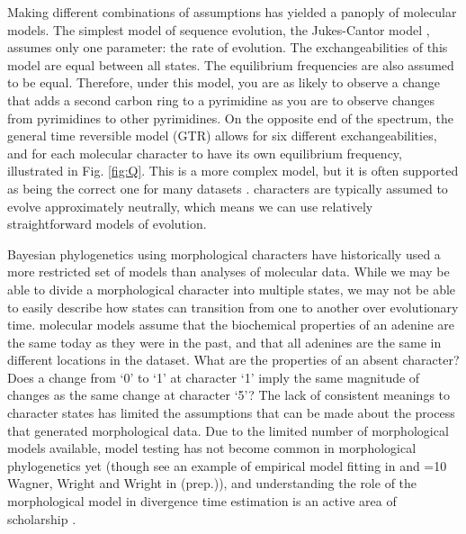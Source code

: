 Making different combinations of assumptions has yielded a panoply of molecular models.
The simplest model of sequence evolution, the Jukes-Cantor model \citep{Jukes1969}, assumes only one parameter: the rate of evolution.
The exchangeabilities of this model are equal between all states.
The equilibrium frequencies are also assumed to be equal.
Therefore, under this model, you are as likely to observe a change that adds a second carbon ring to a pyrimidine as you are to observe changes from pyrimidines to other pyrimidines.
On the opposite end of the spectrum, the general time reversible model (GTR) \citep{Tavare1986} allows for six different exchangeabilities, and for each molecular character to have its own equilibrium frequency, illustrated in Fig. \ref{fig:Q}.
This is a more complex model, but it is often supported as being the correct one for many datasets \citep{abadi2019}.
 characters are typically assumed to evolve approximately neutrally, which means we can use relatively straightforward models of evolution.

Bayesian phylogenetics using morphological characters have historically used a more restricted set of models than analyses of molecular data.
While we may be able to divide a  morphological character into multiple states, we may not be able to easily describe how states can transition from one to another over evolutionary time.
 molecular models assume that the biochemical properties of an adenine are the same today as they were in the past, and
that all adenines are the same in different locations in the dataset.
What are the properties of an absent  character?
Does a change from  `0' to `1' at character `1' imply the same magnitude of changes as the same change  at character `5'?
The lack of consistent meanings to character states has limited the assumptions that can be made about the process that generated morphological data.
Due to the limited number of morphological models available, model testing has not become common in morphological phylogenetics yet (though see an example of empirical model fitting in \cite*{bapst2017} and \ifnum\value{num}=10 {Wagner, Wright and Wright in (prep.)}\fi),
and understanding the role of the morphological model in divergence time estimation is an active area of scholarship \citep{Klopfstein2019}.

